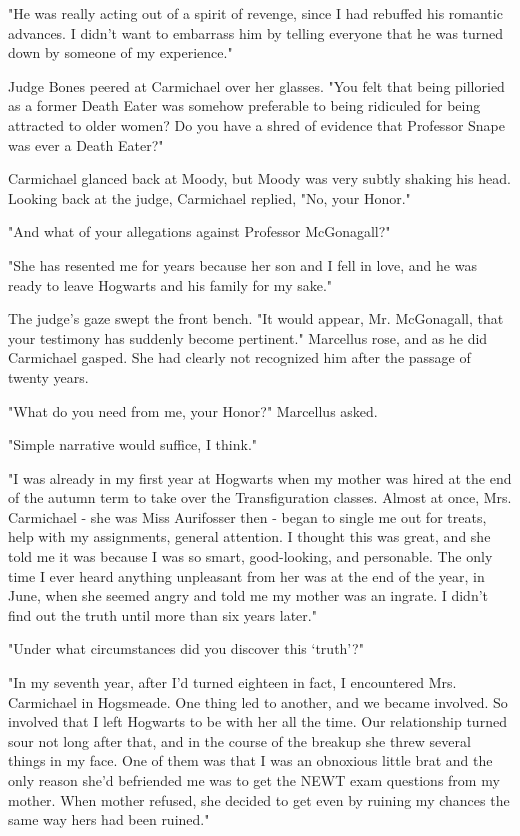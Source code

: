 "He was really acting out of a spirit of revenge, since I had rebuffed his romantic advances. I didn't want to embarrass him by telling everyone that he was turned down by someone of my experience."

Judge Bones peered at Carmichael over her glasses. "You felt that being pilloried as a former Death Eater was somehow preferable to being ridiculed for being attracted to older women? Do you have a shred of evidence that Professor Snape was ever a Death Eater?"

Carmichael glanced back at Moody, but Moody was very subtly shaking his head. Looking back at the judge, Carmichael replied, "No, your Honor."

"And what of your allegations against Professor McGonagall?"

"She has resented me for years because her son and I fell in love, and he was ready to leave Hogwarts and his family for my sake."

The judge's gaze swept the front bench. "It would appear, Mr. McGonagall, that your testimony has suddenly become pertinent." Marcellus rose, and as he did Carmichael gasped. She had clearly not recognized him after the passage of twenty years.

"What do you need from me, your Honor?" Marcellus asked.

"Simple narrative would suffice, I think."

"I was already in my first year at Hogwarts when my mother was hired at the end of the autumn term to take over the Transfiguration classes. Almost at once, Mrs. Carmichael - she was Miss Aurifosser then - began to single me out for treats, help with my assignments, general attention. I thought this was great, and she told me it was because I was so smart, good-looking, and personable. The only time I ever heard anything unpleasant from her was at the end of the year, in June, when she seemed angry and told me my mother was an ingrate. I didn't find out the truth until more than six years later."

"Under what circumstances did you discover this `truth'?"

"In my seventh year, after I'd turned eighteen in fact, I encountered Mrs. Carmichael in Hogsmeade. One thing led to another, and we became involved. So involved that I left Hogwarts to be with her all the time. Our relationship turned sour not long after that, and in the course of the breakup she threw several things in my face. One of them was that I was an obnoxious little brat and the only reason she'd befriended me was to get the NEWT exam questions from my mother. When mother refused, she decided to get even by ruining my chances the same way hers had been ruined."

